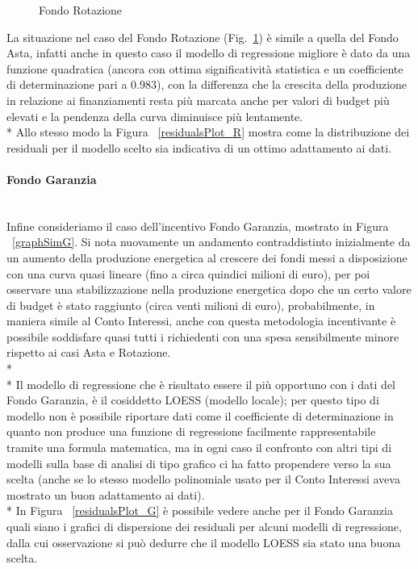 \documentclass[12pt,a4paper,openright,twoside]{report}
\newcommand{\myparagraph}[1]{\paragraph{#1}\mbox{}\\}
\begin{document}
\begin{figure}[H]
	\centering
	\qquad
	\caption{Fondo Rotazione}
	\label{graphSimR}
\end{figure}

La situazione nel caso del Fondo Rotazione (Fig.~\ref{graphSimR}) è simile a quella del Fondo Asta, infatti anche in questo caso il modello di regressione migliore è dato da una funzione quadratica (ancora con ottima significatività statistica e un coefficiente di determinazione pari a 0.983), con la differenza che la crescita della produzione in relazione ai finanziamenti resta più marcata anche per valori di budget più elevati e la pendenza della curva diminuisce più lentamente.\\*
Allo stesso modo la Figura ~\ref{residualsPlot_R} mostra come la distribuzione dei residuali per il modello scelto sia indicativa di un ottimo adattamento ai dati.

\myparagraph{Fondo Garanzia}

Infine consideriamo il caso dell'incentivo Fondo Garanzia, mostrato in Figura ~\ref{graphSimG}. Si nota nuovamente un andamento contraddistinto inizialmente da un aumento della produzione energetica al crescere dei fondi messi a disposizione con una curva quasi lineare (fino a circa quindici milioni di euro), per poi osservare una stabilizzazione nella produzione energetica dopo che un certo valore di budget è stato raggiunto (circa venti milioni di euro), probabilmente, in maniera simile al Conto Interessi, anche con questa metodologia incentivante è possibile soddisfare quasi tutti i richiedenti con una spesa sensibilmente minore rispetto ai casi Asta e Rotazione.\\*\\*
Il modello di regressione che è risultato essere il più opportuno con i dati del Fondo Garanzia, è il cosiddetto LOESS (modello locale); per questo tipo di modello non è possibile riportare dati come il coefficiente di determinazione in quanto non produce una funzione di regressione facilmente rappresentabile tramite una formula matematica, ma in ogni caso il confronto con altri tipi di modelli sulla base di analisi di tipo grafico ci ha fatto propendere verso la sua scelta (anche se lo stesso modello polinomiale usato per il Conto Interessi aveva mostrato un buon adattamento ai dati).\\*
In Figura ~\ref{residualsPlot_G} è possibile vedere anche per il Fondo Garanzia quali siano i grafici di dispersione dei residuali per alcuni modelli di regressione, dalla cui osservazione si può dedurre che il modello LOESS sia stato una buona scelta.
\end{document}
